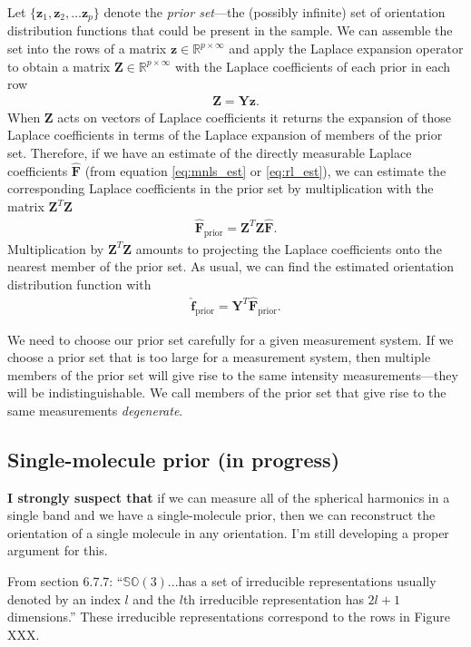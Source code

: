 \documentclass[10pt]{article}
\providecommand{\mb}[1]{\mathbf{#1}}
\providecommand{\mbb}[1]{\mathbb{#1}}
\begin{document}
Let $\{\mb{z}_1, \mb{z}_2,\ldots \mb{z}_p\}$ denote the \textit{prior set}---the
(possibly infinite) set of orientation distribution functions that could be
present in the sample. We can assemble the set into the rows of a matrix
$\mb{z}\in\mbb{R}^{p\times\infty}$ and apply the Laplace expansion
operator to obtain a matrix $\mb{Z}\in\mbb{R}^{p\times\infty}$ with the
Laplace coefficients of each prior in each row
\begin{align}
  \mb{Z} = \mb{Y}\mb{z}.
\end{align}
When $\mb{Z}$ acts on vectors of Laplace coefficients it returns the expansion
of those Laplace coefficients in terms of the Laplace expansion of members of
the prior set. Therefore, if we have an estimate of the directly measurable
Laplace coefficients $\hat{\mb{F}}$ (from equation \ref{eq:mnls_est} or
\ref{eq:rl_est}), we can estimate the corresponding Laplace coefficients in the
prior set by multiplication with the matrix $\mb{Z}^T\mb{Z}$
\begin{align}
  \hat{\mb{F}}_{\text{prior}} = \mb{Z}^T\mb{Z}\hat{\mb{F}}. \label{eq:prior}
\end{align}
Multiplication by $\mb{Z}^T\mb{Z}$ amounts to projecting the Laplace
coefficients onto the nearest member of the prior set. As usual, we can find
the estimated orientation distribution function with
\begin{align}
  \hat{\mb{f}}_{\text{prior}} = \mb{Y}^T\hat{\mb{F}}_{\text{prior}}.
\end{align}

We need to choose our prior set carefully for a given measurement system. If we
choose a prior set that is too large for a measurement system, then multiple
members of the prior set will give rise to the same intensity
measurements---they will be indistinguishable. We call members of the prior set
that give rise to the same measurements \textit{degenerate}.

\subsection{Single-molecule prior (in progress)}
\textbf{I strongly suspect that} if we can measure all of the spherical
harmonics in a single band and we have a single-molecule prior, then we can
reconstruct the orientation of a single molecule in any orientation. I'm still
developing a proper argument for this.

From \cite{barrett} section 6.7.7: ``$\mbb{SO}(3)$...has a set of irreducible
representations usually denoted by an index $l$ and the $l$th irreducible
representation has $2l+1$ dimensions.'' These irreducible representations
correspond to the rows in Figure XXX.
\end{document}
